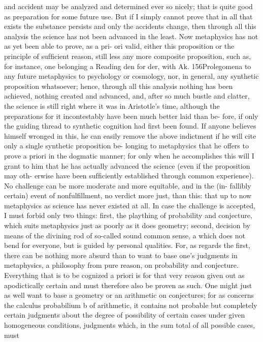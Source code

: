 and accident may be analyzed and determined ever so nicely; that is
quite good as preparation for some future use. But if I simply cannot
prove that in all that exists the substance persists and only the accidents
change, then through all this analysis the science has not been advanced
in the least. Now metaphysics has not as yet been able to prove, as a pri-
ori valid, either this proposition or the principle of sufﬁcient reason, still
less any more composite proposition, such as, for instance, one belonging
a
Reading den for der, with Ak.
156Prolegomena to any future metaphysics
to psychology or cosmology, nor, in general, any synthetic proposition
whatsoever; hence, through all this analysis nothing has been achieved,
nothing created and advanced, and, after so much bustle and clatter,
the science is still right where it was in Aristotle’s time, although the
preparations for it incontestably have been much better laid than be-
fore, if only the guiding thread to synthetic cognition had ﬁrst been
found.
If anyone believes himself wronged in this, he can easily remove the
above indictment if he will cite only a single synthetic proposition be-
longing to metaphysics that he offers to prove a priori in the dogmatic
manner; for only when he accomplishes this will I grant to him that
he has actually advanced the science (even if the proposition may oth-
erwise have been sufﬁciently established through common experience).
No challenge can be more moderate and more equitable, and in the (in-
fallibly certain) event of nonfulﬁllment, no verdict more just, than this:
that up to now metaphysics as science has never existed at all.
In case the challenge is accepted, I must forbid only two things: ﬁrst,
the plaything of probability and conjecture, which suits metaphysics just
as poorly as it does geometry; second, decision by means of the divining
rod of so-called sound common sense, a which does not bend for everyone,
but is guided by personal qualities.
For, as regards the ﬁrst, there can be nothing more absurd than to want
to base one’s judgments in metaphysics, a philosophy from pure reason,
on probability and conjecture. Everything that is to be cognized a priori is
for that very reason given out as apodictically certain and must therefore
also be proven as such. One might just as well want to base a geometry
or an arithmetic on conjectures; for as concerns the calculus probabilium b
of arithmetic, it contains not probable but completely certain judgments
about the degree of possibility of certain cases under given homogeneous
conditions, judgments which, in the sum total of all possible cases, must
